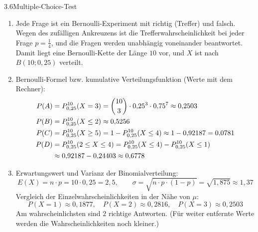 \begin{loesung}{3.6}{Multiple-Choice-Test}
\begin{enumerate}[label=\alph*)]
  \item Jede Frage ist ein Bernoulli-Experiment mit \glqq richtig\grqq{} (Treffer) und \glqq falsch\grqq. Wegen des zufälligen Ankreuzens ist die Trefferwahrscheinlichkeit bei jeder Frage $p=\frac{1}{4}$, und die Fragen werden unabhängig voneinander beantwortet. Damit liegt eine Bernoulli-Kette der Länge $10$ vor, und $X$ ist nach $B(10;0{,}25)$ verteilt.
  \item Bernoulli-Formel bzw. kumulative Verteilungsfunktion (Werte mit dem Rechner):
  \begin{align*}
    P(A) &= P^{10}_{0{,}25}(X=3) = \dbinom{10}{3}\cdot 0{,}25^3\cdot 0{,}75^7\approx 0{,}2503\\
    P(B) &= P^{10}_{0{,}25}(X\leq 2)\approx 0{,}5256\\
    P(C) &= P^{10}_{0{,}25}(X\geq 5) = 1-P^{10}_{0{,}25}(X\leq 4)\approx 1-0{,}92187 = 0{,}0781\\
    P(D) &= P^{10}_{0{,}25}(2\leq X\leq 4) = P^{10}_{0{,}25}(X\leq 4)-P^{10}_{0{,}25}(X\leq 1)\\
         &\approx 0{,}92187-0{,}24403\approx 0{,}6778
  \end{align*}
  \item Erwartungswert und Varianz der Binomialverteilung:
  \[E(X) = n\cdot p = 10\cdot 0{,}25 = 2{,}5,\qquad\sigma = \sqrt{n\cdot p\cdot(1-p)} = \sqrt{1{,}875}\approx 1{,}37\]
  Vergleich der Einzelwahrscheinlichkeiten in der Nähe von $\mu$:
  \[P(X=1)\approx 0{,}1877,\quad P(X=2)\approx 0{,}2816,\quad P(X=3)\approx 0{,}2503\]
  Am wahrscheinlichsten sind $2$ richtige Antworten. (Für weiter entfernte Werte werden die Wahrscheinlichkeiten noch kleiner.)
\end{enumerate}
\end{loesung}


